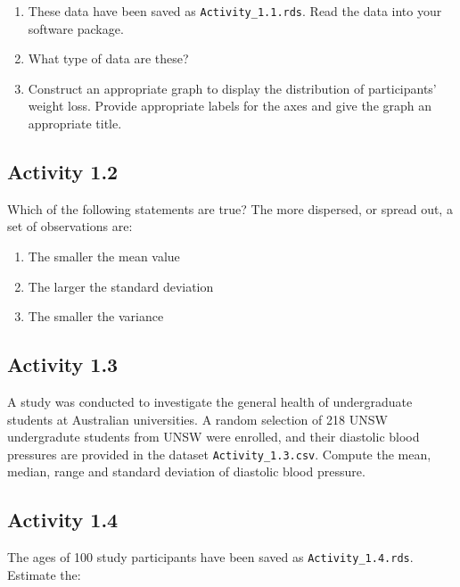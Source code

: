 \documentclass[
  a4paper,
]{memoir}
\providecommand{\tightlist}{%
  \setlength{\itemsep}{0pt}\setlength{\parskip}{0pt}}
\begin{document}
\begin{enumerate}
\def\labelenumi{\alph{enumi})}
\tightlist
\item
  These data have been saved as \texttt{Activity\_1.1.rds}. Read the
  data into your software package.
\item
  What type of data are these?
\item
  Construct an appropriate graph to display the distribution of
  participants' weight loss. Provide appropriate labels for the axes and
  give the graph an appropriate title.
\end{enumerate}

\subsection*{Activity 1.2}\label{activity-1.2}

Which of the following statements are true? The more dispersed, or
spread out, a set of observations are:

\begin{enumerate}
\def\labelenumi{\alph{enumi})}
\tightlist
\item
  The smaller the mean value
\item
  The larger the standard deviation
\item
  The smaller the variance
\end{enumerate}

\subsection*{Activity 1.3}\label{activity-1.3}

A study was conducted to investigate the general health of undergraduate
students at Australian universities. A random selection of 218 UNSW
undergradute students from UNSW were enrolled, and their diastolic blood
pressures are provided in the dataset \texttt{Activity\_1.3.csv}.
Compute the mean, median, range and standard deviation of diastolic
blood pressure.

\subsection*{Activity 1.4}\label{activity-1.4}

The ages of 100 study participants have been saved as
\texttt{Activity\_1.4.rds}. Estimate the:
\end{document}
